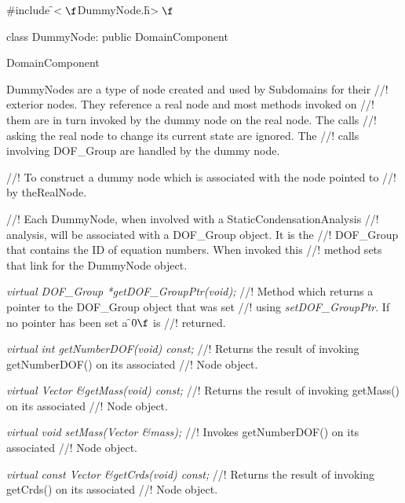 

\indent \#include \f$<\f$DummyNode.h\f$>\f$

\indent class DummyNode: public DomainComponent



\indent DomainComponent
\indent{}

\indent DummyNodes are a type of node created and used by Subdomains for their
//! exterior nodes. They reference a real node and most methods invoked on
//! them are in turn invoked by the dummy node on the real node. The calls
//! asking the real node to change its current state are ignored. The
//! calls involving DOF\_Group are handled by the dummy node.


//! To construct a dummy node which is associated with the node pointed to
//! by \p theRealNode.


//! Each DummyNode, when involved with a StaticCondensationAnalysis
//! analysis, will be associated with a DOF\_Group object. It is the
//! DOF\_Group that contains the ID of equation numbers. When invoked this
//! method sets that link for the DummyNode object. 


{\em virtual DOF\_Group *getDOF\_GroupPtr(void);}
//! Method which returns a pointer to the DOF\_Group object that was set
//! using {\em setDOF\_GroupPtr}. If no pointer has been set a \f$0\f$ is
//! returned.


{\em virtual int getNumberDOF(void) const;}
//! Returns the result of invoking getNumberDOF() on its associated
//! Node object. 

{\em virtual Vector \&getMass(void) const;}
//! Returns the result of invoking getMass() on its associated
//! Node object. 


{\em virtual void setMass(Vector \&mass);}
//! Invokes getNumberDOF() on its associated
//! Node object. 


{\em virtual const Vector \&getCrds(void) const;}
//! Returns the result of invoking getCrds() on its associated
//! Node object. 


